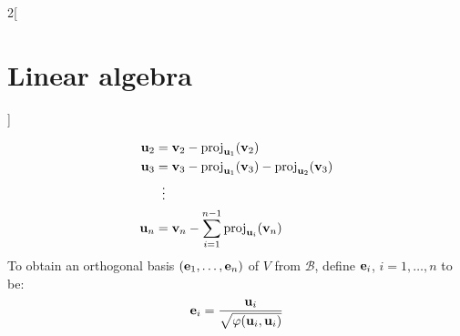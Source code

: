 \documentclass[../../../main.tex]{subfiles}
\begin{document}
\begin{multicols}{2}[\section{Linear algebra}]
\begin{method}
\begin{align*}
      \boldsymbol{\mathrm{u}}_2 & =\boldsymbol{\mathrm{v}}_2-\text{proj}_{\boldsymbol{\mathrm{u}}_1}(\boldsymbol{\mathrm{v}}_2)                                                          \\
      \boldsymbol{\mathrm{u}}_3 & =\boldsymbol{\mathrm{v}}_3-\text{proj}_{\boldsymbol{\mathrm{u}}_1}(\boldsymbol{\mathrm{v}}_3)-\text{proj}_{\boldsymbol{\mathrm{u}}_2}(\boldsymbol{\mathrm{v}}_3) \\
                           & \;\;\vdots                                                                                                                              \\
      \boldsymbol{\mathrm{u}}_n & =\boldsymbol{\mathrm{v}}_n-\sum_{i=1}^{n-1}\text{proj}_{\boldsymbol{\mathrm{u}}_i}(\boldsymbol{\mathrm{v}}_n)
    \end{align*}
    To obtain an orthogonal basis $(\boldsymbol{\mathrm{e}}_1,\ldots,\boldsymbol{\mathrm{e}}_n)$ of $V$ from $\mathcal{B}$, define $\boldsymbol{\mathrm{e}}_i$, $i=1,\ldots,n$ to be: $$\boldsymbol{\mathrm{e}}_i=\frac{\boldsymbol{\mathrm{u}}_i}{\sqrt{\varphi(\boldsymbol{\mathrm{u}}_i,\boldsymbol{\mathrm{u}}_i)}}$$
  \end{method}

\end{multicols}
\end{document}
